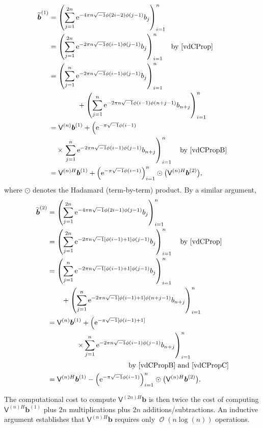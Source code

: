 \documentclass[twocolumn]{svjour3}          %
\DeclareMathOperator{\Order}{{\mathcal O}}
\newcommand{\bm}[1]{\boldsymbol{#1}}
\newcommand{\vb}{\bm{b}}
\newcommand{\mV}{\mathsf{V}}
\newcommand{\me}{\mathrm{e}}
\begin{document}
\begin{align*}
\widetilde{\vb}^{(1)} &= \left( \sum_{j=1}^{2n}  \me^{-4 \pi n \sqrt{-1} \phi(2i-2)\phi(j-1)} b_{j} \right)_{i=1}^n \\
&= \left( \sum_{j=1}^{2n}  \me^{-2 \pi n \sqrt{-1} \phi(i-1)\phi(j-1)} b_{j} \right)_{i=1}^n \quad \text{by \eqref{vdCProp}}\\
&= \left( \sum_{j=1}^{n}  \me^{-2 \pi n \sqrt{-1} \phi(i-1)\phi(j-1)} b_{j} \right)_{i=1}^n \quad \\
&\qquad \qquad +  \left( \sum_{j=1}^{n}  \me^{-2 \pi n \sqrt{-1} \phi(i-1)\phi(n+j-1)} b_{n+j} \right)_{i=1}^n \\
&= \mV^{(n)}\vb^{(1)}  +  \left(  \me^{-\pi \sqrt{-1} \phi(i-1)}  \right .\\
& \quad \times \left . \sum_{j=1}^{n}  \me^{-2 \pi n \sqrt{-1} \phi(i-1)\phi(j-1)} b_{n+j} \right)_{i=1}^n \quad  \text{by \eqref{vdCPropB}}\\
&= \mV^{(n)H}\vb^{(1)} +  \left(  \me^{-\pi \sqrt{-1} \phi(i-1)} \right)_{i=1}^n \odot \bigl(\mV^{(n)H}\vb^{(2)} \bigr),
\end{align*}
where $\odot$ denotes the Hadamard (term-by-term) product.  By a similar argument, 
\begin{align*}
\widetilde{\vb}^{(2)} &= \left( \sum_{j=1}^{2n}  \me^{-4 \pi n \sqrt{-1} \phi(2i-1)\phi(j-1)} b_{j} \right)_{i=1}^n \\
&= \left( \sum_{j=1}^{2n}  \me^{-2 \pi n \sqrt{-1} [\phi(i-1)+1]\phi(j-1)} b_{j} \right)_{i=1}^n \quad \text{by \eqref{vdCProp}}\\
&= \left( \sum_{j=1}^{n}  \me^{-2 \pi n \sqrt{-1} [\phi(i-1)+1]\phi(j-1)} b_{j} \right)_{i=1}^n \quad \\
&\qquad  +  \left( \sum_{j=1}^{n}  \me^{-2 \pi n \sqrt{-1} [\phi(i-1)+1]\phi(n+j-1)} b_{n+j} \right)_{i=1}^n \\
&= \mV^{(n)}\vb^{(1)} 
+  \left(  \me^{ -\pi \sqrt{-1} [\phi(i-1) + 1]} \right. 
\\
& \qquad \qquad \left . \times \sum_{j=1}^{n}  \me^{-2 \pi n \sqrt{-1} \phi(i-1)\phi(j-1)} b_{n+j} \right)_{i=1}^n \\
& \hspace{4cm}  \text{by \eqref{vdCPropB} and \eqref{vdCPropC}}\\
&= \mV^{(n)H}\vb^{(1)} -  \left(  \me^{-\pi \sqrt{-1} \phi(i-1)} \right)_{i=1}^n \odot \bigl(\mV^{(n)H}\vb^{(2)} \bigr).
\end{align*}

The computational cost to compute $\mV^{(2n)H}\vb$ is then twice the cost of computing $\mV^{(n)H}\vb^{(1)}$ plus $2n$ multiplications plus $2n$ additions/subtractions.  An inductive argument establishes that $\mV^{(n)H}\vb$ requires only $\Order(n \log(n))$ operations.
\end{document}
